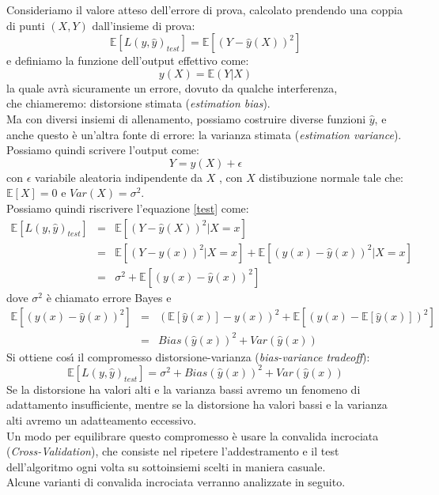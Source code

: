 \documentclass[a4paper,12pt,oneside]{book}
\begin{document}
Consideriamo il valore atteso dell'errore di prova, calcolato prendendo una coppia di punti $(X,Y)$ dall'insieme di prova:
\begin{equation}\label{test}
\mathbb{E} [L(y,\hat{y})_{test}]=\mathbb{E} [(Y-\hat{y}(X))^{2}]
\end{equation}
e definiamo la funzione dell'output effettivo come:
$$y(X)=\mathbb{E}(Y|X)$$
la quale avr\`{a} sicuramente un errore, dovuto da qualche interferenza,\\
che chiameremo: distorsione stimata (\textit{estimation bias}).\\
Ma con diversi insiemi di allenamento, possiamo costruire diverse funzioni $\hat{y}$, e anche questo \`e un'altra fonte di errore: la varianza stimata (\textit{estimation variance}). Possiamo quindi scrivere l'output come:
$$Y=y(X)+\epsilon$$ con $\epsilon$ variabile aleatoria indipendente da $X$ , con $X$ distibuzione normale tale che: $\mathbb{E}[X]=0$ e $Var(X)=\sigma^{2}$.\\
Possiamo quindi riscrivere l'equazione \ref{test} come:
\begin{eqnarray}
\mathbb{E} [L(y,\hat{y})_{test}] &=&\mathbb{E} [(Y-\hat{y}(X))^{2}|X=x]\nonumber\\
&=&\mathbb{E}[(Y-y(x))^2 |X=x]+\mathbb{E}[(y(x)-\hat{y}(x))^{2}|X=x]\nonumber\\
&=&\sigma^{2}+\mathbb{E}[(y(x)-\hat{y}(x))^{2}]
\end{eqnarray}
dove $\sigma^{2}$ \`e chiamato errore Bayes e
\begin{eqnarray}
\mathbb{E}[(y(x)-\hat{y}(x))^{2}]&=&(\mathbb{E}[\hat{y}(x)]-y(x))^{2}+\mathbb{E}[(\hat{y}(x)-\mathbb{E}[\hat{y}(x)])^{2}]\nonumber\\
&=&Bias(\hat{y}(x))^{2}+Var(\hat{y}(x))
\end{eqnarray}
Si ottiene cos\'{\i} il compromesso distorsione-varianza (\textit{bias-variance tradeoff}):
\begin{equation}
\mathbb{E} [L(y,\hat{y})_{test}]=\sigma^2+Bias(\hat{y}(x))^2 + Var(\hat{y}(x))
\end{equation}
Se la distorsione ha valori alti e la varianza bassi avremo un fenomeno di adattamento insufficiente, mentre se la distorsione ha valori bassi e la varianza alti avremo un adatteamento eccessivo.\cite{errval}\\
Un modo per equilibrare questo compromesso \`e usare la convalida incrociata (\textit{Cross-Validation}), che consiste nel ripetere l'addestramento e il test dell'algoritmo ogni volta su sottoinsiemi scelti in maniera casuale.\\
Alcune varianti di convalida incrociata verranno analizzate in seguito.
\newpage
\end{document}
